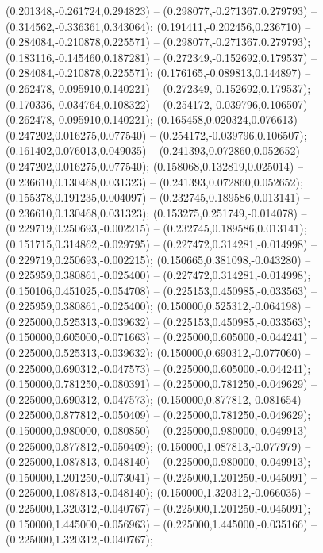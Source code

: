  (0.201348,-0.261724,0.294823) -- (0.298077,-0.271367,0.279793) -- (0.314562,-0.336361,0.343064);
 (0.191411,-0.202456,0.236710) -- (0.284084,-0.210878,0.225571) -- (0.298077,-0.271367,0.279793);
 (0.183116,-0.145460,0.187281) -- (0.272349,-0.152692,0.179537) -- (0.284084,-0.210878,0.225571);
 (0.176165,-0.089813,0.144897) -- (0.262478,-0.095910,0.140221) -- (0.272349,-0.152692,0.179537);
 (0.170336,-0.034764,0.108322) -- (0.254172,-0.039796,0.106507) -- (0.262478,-0.095910,0.140221);
 (0.165458,0.020324,0.076613) -- (0.247202,0.016275,0.077540) -- (0.254172,-0.039796,0.106507);
 (0.161402,0.076013,0.049035) -- (0.241393,0.072860,0.052652) -- (0.247202,0.016275,0.077540);
 (0.158068,0.132819,0.025014) -- (0.236610,0.130468,0.031323) -- (0.241393,0.072860,0.052652);
 (0.155378,0.191235,0.004097) -- (0.232745,0.189586,0.013141) -- (0.236610,0.130468,0.031323);
 (0.153275,0.251749,-0.014078) -- (0.229719,0.250693,-0.002215) -- (0.232745,0.189586,0.013141);
 (0.151715,0.314862,-0.029795) -- (0.227472,0.314281,-0.014998) -- (0.229719,0.250693,-0.002215);
 (0.150665,0.381098,-0.043280) -- (0.225959,0.380861,-0.025400) -- (0.227472,0.314281,-0.014998);
 (0.150106,0.451025,-0.054708) -- (0.225153,0.450985,-0.033563) -- (0.225959,0.380861,-0.025400);
 (0.150000,0.525312,-0.064198) -- (0.225000,0.525313,-0.039632) -- (0.225153,0.450985,-0.033563);
 (0.150000,0.605000,-0.071663) -- (0.225000,0.605000,-0.044241) -- (0.225000,0.525313,-0.039632);
 (0.150000,0.690312,-0.077060) -- (0.225000,0.690312,-0.047573) -- (0.225000,0.605000,-0.044241);
 (0.150000,0.781250,-0.080391) -- (0.225000,0.781250,-0.049629) -- (0.225000,0.690312,-0.047573);
 (0.150000,0.877812,-0.081654) -- (0.225000,0.877812,-0.050409) -- (0.225000,0.781250,-0.049629);
 (0.150000,0.980000,-0.080850) -- (0.225000,0.980000,-0.049913) -- (0.225000,0.877812,-0.050409);
 (0.150000,1.087813,-0.077979) -- (0.225000,1.087813,-0.048140) -- (0.225000,0.980000,-0.049913);
 (0.150000,1.201250,-0.073041) -- (0.225000,1.201250,-0.045091) -- (0.225000,1.087813,-0.048140);
 (0.150000,1.320312,-0.066035) -- (0.225000,1.320312,-0.040767) -- (0.225000,1.201250,-0.045091);
 (0.150000,1.445000,-0.056963) -- (0.225000,1.445000,-0.035166) -- (0.225000,1.320312,-0.040767);
